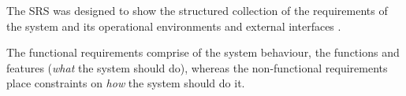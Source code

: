 

The SRS was designed to show the structured collection of the requirements of the system and its operational environments and external interfaces \cite{IEEE24765}. 


The functional requirements comprise of the system behaviour, the functions and features (\textit{what} the system should do), whereas the non-functional requirements place constraints on \textit{how} the system should do it.

